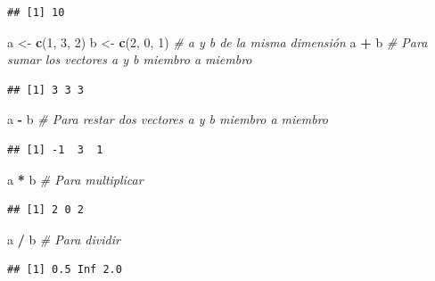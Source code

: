 \documentclass[10pt,]{krantz}
\makeatletter
\newenvironment{Shaded}{\begin{snugshade}}{\end{snugshade}}
\newcommand{\KeywordTok}[1]{\textcolor[rgb]{0.13,0.29,0.53}{\textbf{#1}}}
\newcommand{\DecValTok}[1]{\textcolor[rgb]{0.00,0.00,0.81}{#1}}
\newcommand{\StringTok}[1]{\textcolor[rgb]{0.31,0.60,0.02}{#1}}
\newcommand{\CommentTok}[1]{\textcolor[rgb]{0.56,0.35,0.01}{\textit{#1}}}
\newcommand{\OperatorTok}[1]{\textcolor[rgb]{0.81,0.36,0.00}{\textbf{#1}}}
\newcommand{\NormalTok}[1]{#1}
\newenvironment{kframe}{%
\medskip{}
\setlength{\fboxsep}{.8em}
 \def\at@end@of@kframe{}%
 \ifinner\ifhmode%
  \def\at@end@of@kframe{\end{minipage}}%
  \begin{minipage}{\columnwidth}%
 \fi\fi%
 \def\FrameCommand##1{\hskip\@totalleftmargin \hskip-\fboxsep
 \colorbox{shadecolor}{##1}\hskip-\fboxsep
     \hskip-\linewidth \hskip-\@totalleftmargin \hskip\columnwidth}%
 \MakeFramed {\advance\hsize-\width
   \@totalleftmargin\z@ \linewidth\hsize
   \@setminipage}}%
 {\par\unskip\endMakeFramed%
 \at@end@of@kframe}
\renewenvironment{Shaded}{\begin{kframe}}{\end{kframe}}
\makeatother
\begin{document}
\begin{verbatim}
## [1] 10
\end{verbatim}

\begin{Shaded}
\begin{Highlighting}[]
\NormalTok{a <-}\StringTok{ }\KeywordTok{c}\NormalTok{(}\DecValTok{1}\NormalTok{, }\DecValTok{3}\NormalTok{, }\DecValTok{2}\NormalTok{)}
\NormalTok{b <-}\StringTok{ }\KeywordTok{c}\NormalTok{(}\DecValTok{2}\NormalTok{, }\DecValTok{0}\NormalTok{, }\DecValTok{1}\NormalTok{)  }\CommentTok{# a y b de la misma dimensión}
\NormalTok{a }\OperatorTok{+}\StringTok{ }\NormalTok{b  }\CommentTok{# Para sumar los vectores a y b miembro a miembro}
\end{Highlighting}
\end{Shaded}

\begin{verbatim}
## [1] 3 3 3
\end{verbatim}

\begin{Shaded}
\begin{Highlighting}[]
\NormalTok{a }\OperatorTok{-}\StringTok{ }\NormalTok{b  }\CommentTok{# Para restar dos vectores a y b miembro a miembro}
\end{Highlighting}
\end{Shaded}

\begin{verbatim}
## [1] -1  3  1
\end{verbatim}

\begin{Shaded}
\begin{Highlighting}[]
\NormalTok{a }\OperatorTok{*}\StringTok{ }\NormalTok{b  }\CommentTok{# Para multiplicar}
\end{Highlighting}
\end{Shaded}

\begin{verbatim}
## [1] 2 0 2
\end{verbatim}

\begin{Shaded}
\begin{Highlighting}[]
\NormalTok{a }\OperatorTok{/}\StringTok{ }\NormalTok{b  }\CommentTok{# Para dividir}
\end{Highlighting}
\end{Shaded}

\begin{verbatim}
## [1] 0.5 Inf 2.0
\end{verbatim}
\end{document}
